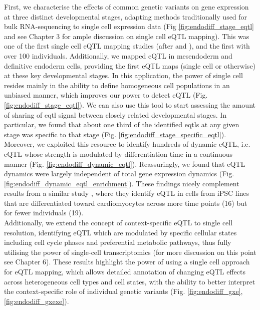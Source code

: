 First, we characterise the effects of common genetic variants on gene expression at three distinct developmental stages, adapting methods traditionally used for bulk RNA-sequencing to single cell expression data (Fig \ref{fig:endodiff_stage_eqtl} and see Chapter 3 
for ample discussion on single cell eQTL mapping).
This was one of the first single cell eQTL mapping studies (after \cite{wills2013single} and \cite{van2018single}), and the first with over 100 individuals.
Additionally, we mapped eQTL in mesendoderm and definitive endoderm cells, providing the first eQTL maps (single cell or otherwise) at these key developmental stages. 
In this application, the power of single cell resides mainly in the ability to define homogeneous cell populations in an unbiased manner, which improves our power to detect eQTL (Fig. \ref{fig:endodiff_stage_eqtl}).
We can also use this tool to start assessing the amount of sharing of \gls{eqtl} signal between closely related developmental stages.
In particular, we found that about one third of the identified \glspl{eqtl} at any given stage was specific to that stage (Fig. \ref{fig:endodiff_stage_specific_eqtl}).\\

Moreover, we exploited this resource to identify hundreds of dynamic eQTL, i.e. eQTL whose strength is modulated by differentiation time in a continuous manner (Fig. \ref{fig:endodiff_dynamic_eqtl}).
Reassuringly, we found that eQTL dynamics were largely independent of total gene expression dynamics (Fig. \ref{fig:endodiff_dynamic_eqtl_enrichment}).
These findings nicely complement results from a similar study \cite{strober2019dynamic}, where they identify eQTL in cells from iPSC lines that are differentiated toward cardiomyocytes across more time points (16) but for fewer individuals (19).\\

Additionally, we extend the concept of context-specific eQTL \cite{fairfax2012genetics, fairfax2014innate, knowles2017allele} to single cell resolution, identifying eQTL which are modulated by specific cellular states including cell cycle phases and preferential metabolic pathways, thus fully utilising the power of single-cell transcriptomics (for more discussion on this point see Chapter 
6).
These results highlight the power of using a single cell approach for eQTL mapping, which allows detailed annotation of changing eQTL effects across heterogeneous cell types and cell states, with the ability to better interpret the context-specific role of individual genetic variants (Fig. \ref{fig:endodiff_gxe}, \ref{fig:endodiff_gxexe}). \\

